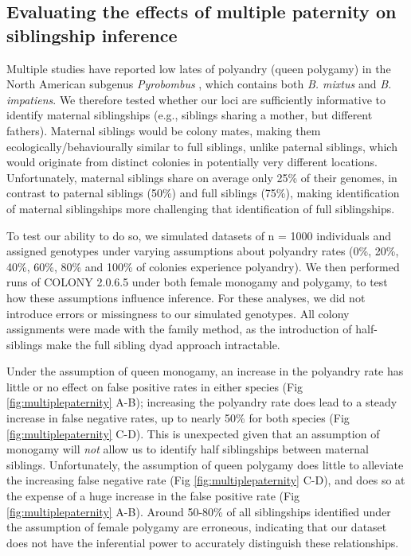 \documentclass[12pt]{article}
\begin{document}
\subsection{Evaluating the effects of multiple paternity on siblingship inference}
Multiple studies have reported low lates of polyandry (queen polygamy) in the North American subgenus \emph{Pyrobombus} \parencite{payneFrequencyMultiplePaternity2003, owenMonandryPolyandryThree2013}, which contains both \emph{B. mixtus} and \emph{B. impatiens}. We therefore tested whether our loci are sufficiently informative to identify maternal siblingships (e.g., siblings sharing a mother, but different fathers). Maternal siblings would be colony mates, making them ecologically/behaviourally similar to full siblings, unlike paternal siblings, which would originate from distinct colonies in potentially very different locations. Unfortunately, maternal siblings share on average only 25\% of their genomes, in contrast to paternal siblings (50\%) and full siblings (75\%), making identification of maternal siblingships more challenging that identification of full siblingships.

To test our ability to do so, we simulated datasets of n = 1000 individuals and assigned genotypes under varying assumptions about polyandry rates (0\%, 20\%, 40\%, 60\%, 80\% and 100\% of colonies experience polyandry). We then performed runs of COLONY 2.0.6.5 under both female monogamy and polygamy, to test how these assumptions influence inference. For these analyses, we did not introduce errors or missingness to our simulated genotypes. All colony assignments were made with the family method, as the introduction of half-siblings make the full sibling dyad approach intractable.

Under the assumption of queen monogamy, an increase in the polyandry rate has little or no effect on false positive rates in either species (Fig \ref{fig:multiplepaternity} A-B); increasing the polyandry rate does lead to a steady increase in false negative rates, up to nearly 50\% for both species (Fig \ref{fig:multiplepaternity} C-D). This is unexpected given that an assumption of monogamy will \emph{not} allow us to identify half siblingships between maternal siblings. Unfortunately, the assumption of queen polygamy does little to alleviate the increasing false negative rate (Fig \ref{fig:multiplepaternity} C-D), and does so at the expense of a huge increase in the false positive rate (Fig \ref{fig:multiplepaternity} A-B). Around 50-80\% of all siblingships identified under the assumption of female polygamy are erroneous, indicating that our dataset does not have the inferential power to accurately distinguish these relationships.
\end{document}
